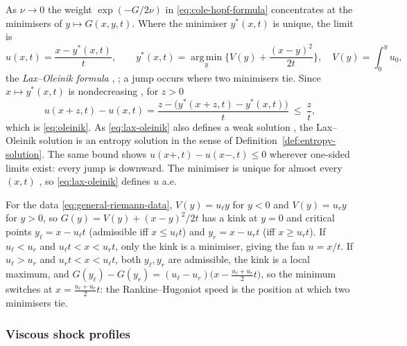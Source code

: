 \begin{remark}
\label{rem:lax-oleinik}
As $\nu\to0$ the weight $\exp(-G/2\nu)$ in \eqref{eq:cole-hopf-formula}
concentrates at the minimisers of $y\mapsto G(x,y,t)$. Where the minimiser
$y^*(x,t)$ is unique, the limit is
\begin{equation}
  \label{eq:lax-oleinik}
  u(x,t)=\frac{x-y^*(x,t)}{t},\qquad
  y^*(x,t)=\operatorname*{arg\,min}_y\Big\{V(y)+\frac{(x-y)^2}{2t}\Big\},
  \quad V(y)=\int_0^y u_0 ,
\end{equation}
the \emph{Lax--Oleinik formula} \cite{lax1957,oleinik1957},
\cite[\S3.4.2]{evans2010}; a jump occurs where two minimisers tie. Since
$x\mapsto y^*(x,t)$ is nondecreasing \cite[\S3.4.2]{evans2010}, for $z>0$
\begin{equation*}
  u(x+z,t)-u(x,t)=\frac{z-\big(y^*(x+z,t)-y^*(x,t)\big)}{t}\ \le\ \frac zt,
\end{equation*}
which is \eqref{eq:oleinik}. As \eqref{eq:lax-oleinik} also defines a weak
solution \cite[\S3.4.2]{evans2010}, the Lax--Oleinik solution is an entropy
solution in the sense of Definition~\ref{def:entropy-solution}. The same bound
shows $u(x+,t)-u(x-,t)\le0$ wherever one-sided limits exist: every jump is
downward. The minimiser is unique for almost every $(x,t)$
\cite[\S3.4.2]{evans2010}, so \eqref{eq:lax-oleinik} defines $u$ a.e.
\end{remark}

\begin{remark}
\label{rem:riemann-lax-oleinik}
For the data \eqref{eq:general-riemann-data}, $V(y)=u_\ell y$ for $y<0$ and
$V(y)=u_r y$ for $y>0$, so $G(y)=V(y)+(x-y)^2/2t$ has a kink at $y=0$ and
critical points $y_\ell=x-u_\ell t$ (admissible iff $x\le u_\ell t$) and
$y_r=x-u_rt$ (iff $x\ge u_rt$). If $u_\ell<u_r$ and $u_\ell t<x<u_rt$, only the
kink is a minimiser, giving the fan $u=x/t$. If $u_\ell>u_r$ and
$u_rt<x<u_\ell t$, both $y_\ell,y_r$ are admissible, the kink is a local maximum,
and $G(y_\ell)-G(y_r)=(u_\ell-u_r)\big(x-\tfrac{u_\ell+u_r}2t\big)$, so the
minimum switches at $x=\tfrac{u_\ell+u_r}2t$: the Rankine--Hugoniot speed is the
position at which two minimisers tie.\end{remark}

\subsubsection{Viscous shock profiles}
\label{subsubsec:viscous-profiles}

